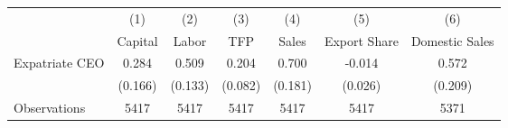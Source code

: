 \begin{tabular}{l*{6}{c}}
\hline\hline
                    &\multicolumn{1}{c}{(1)}&\multicolumn{1}{c}{(2)}&\multicolumn{1}{c}{(3)}&\multicolumn{1}{c}{(4)}&\multicolumn{1}{c}{(5)}&\multicolumn{1}{c}{(6)}\\
                    &\multicolumn{1}{c}{Capital}&\multicolumn{1}{c}{Labor}&\multicolumn{1}{c}{TFP}&\multicolumn{1}{c}{Sales}&\multicolumn{1}{c}{Export Share}&\multicolumn{1}{c}{Domestic Sales}\\
\hline
Expatriate CEO      &       0.284&       0.509&       0.204&       0.700&      -0.014&       0.572\\
                    &     (0.166)&     (0.133)&     (0.082)&     (0.181)&     (0.026)&     (0.209)\\
\hline
Observations        &        5417&        5417&        5417&        5417&        5417&        5371\\
\hline\hline
\end{tabular}
